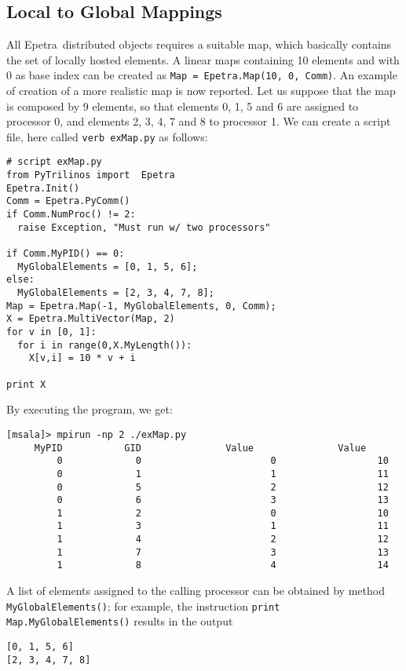 \documentclass[10pt,relax]{SANDreport}
\newcommand{\epetra}{{Epetra}}
\begin{document}
\subsection{Local to Global Mappings}
\label{sec:maps}

All \epetra\ distributed objects requires a suitable map, which basically
contains the set of locally hosted elements. A linear maps containing 10
elements and with 0 as base index can be created as 
\verb!Map = Epetra.Map(10, 0, Comm)!. An example of creation of a more
realistic map is now reported. Let us suppose that the map is 
composed by 9 elements, so that elements 0, 1, 5 and 6
are assigned to processor 0, and elements 2, 3, 4, 7 and 8 to processor 1. We
can create a script file, here called {\tt verb exMap.py} as follows:
\begin{verbatim}
# script exMap.py
from PyTrilinos import  Epetra
Epetra.Init()
Comm = Epetra.PyComm()
if Comm.NumProc() != 2:
  raise Exception, "Must run w/ two processors"

if Comm.MyPID() == 0:
  MyGlobalElements = [0, 1, 5, 6];
else:
  MyGlobalElements = [2, 3, 4, 7, 8];
Map = Epetra.Map(-1, MyGlobalElements, 0, Comm);
X = Epetra.MultiVector(Map, 2)
for v in [0, 1]:
  for i in range(0,X.MyLength()):
    X[v,i] = 10 * v + i

print X
\end{verbatim}
By executing the program, we get:
\begin{verbatim}
[msala]> mpirun -np 2 ./exMap.py
     MyPID           GID               Value               Value  
         0             0                       0                  10
         0             1                       1                  11
         0             5                       2                  12
         0             6                       3                  13
         1             2                       0                  10
         1             3                       1                  11
         1             4                       2                  12
         1             7                       3                  13
         1             8                       4                  14
\end{verbatim}

A list of elements assigned to the calling processor can be obtained by method
\verb!MyGlobalElements()!; for example, the instruction 
{\tt print Map.MyGlobalElements()} results in the output
\begin{verbatim}
[0, 1, 5, 6]
[2, 3, 4, 7, 8]
\end{verbatim}
\end{document}
